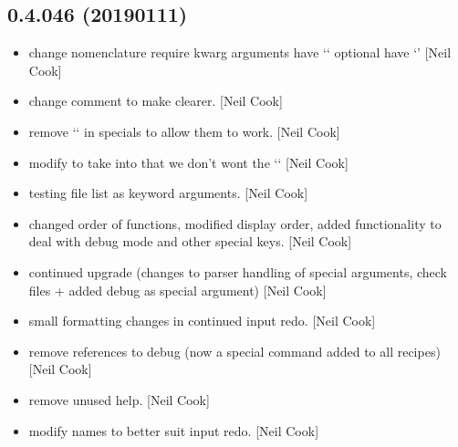 \documentclass[a4paper,10pt,english]{report}
\begin{document}
\subsection{0.4.046 (2019\sphinxhyphen{}01\sphinxhyphen{}11)}
\label{\detokenize{misc/changelog:id237}}\begin{itemize}
\item {} 
 \sphinxhyphen{} change nomenclature require kwarg arguments have
‘\sphinxhyphen{}‘ optional have ‘\textendash{}’ {[}Neil Cook{]}

\item {} 
 \sphinxhyphen{} change comment to make clearer. {[}Neil Cook{]}

\item {} 
 \sphinxhyphen{} remove ‘\sphinxhyphen{}‘ in specials to allow them to work.
{[}Neil Cook{]}

\item {} 
 \sphinxhyphen{} modify  to take into that we don’t wont
the ‘\sphinxhyphen{}‘ {[}Neil Cook{]}

\item {} 
 \sphinxhyphen{} testing file list as keyword arguments. {[}Neil
Cook{]}

\item {} 
 \sphinxhyphen{} changed order of functions, modified display
order, added functionality to deal with debug mode and other special
keys. {[}Neil Cook{]}

\item {} 
 \sphinxhyphen{} continued upgrade (changes to parser handling of
special arguments, check files + added debug as special argument)
{[}Neil Cook{]}

\item {} 
 \sphinxhyphen{} small formatting changes in continued input redo.
{[}Neil Cook{]}

\item {} 
 \sphinxhyphen{} remove references to debug (now a special command
added to all recipes) {[}Neil Cook{]}

\item {} 
 \sphinxhyphen{} remove unused help. {[}Neil Cook{]}

\item {} 
 \sphinxhyphen{} modify names to better suit input redo. {[}Neil Cook{]}

\end{itemize}
\end{document}
